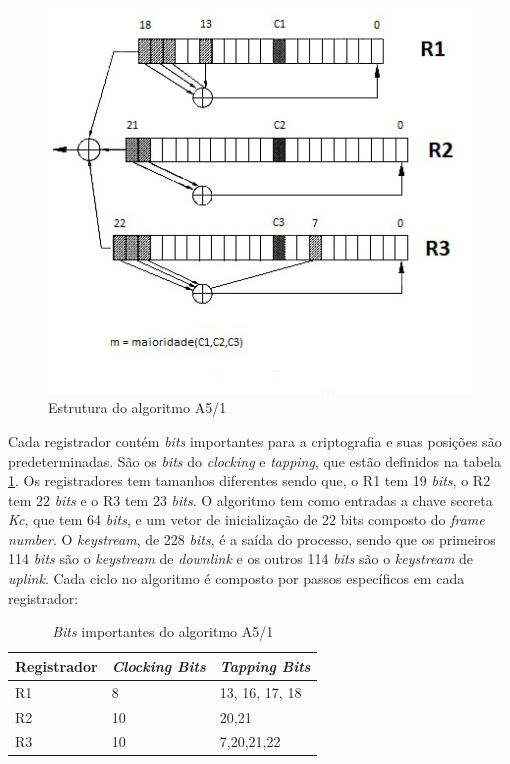 \begin{figure}[h]
\centering
\includegraphics[keepaspectratio=true,scale=0.9]
    {figuras/a5_1.eps}
    \caption[Estrutura do algoritmo A5/1]{Estrutura do algoritmo A5/1\protect\footnotemark} 
\end{figure}

Cada registrador contém \textit{bits} importantes para a criptografia e suas posições são predeterminadas. São os \textit{bits} do \textit{clocking} e \textit{tapping}, que estão definidos na tabela \ref{important-bits}. Os registradores tem tamanhos diferentes sendo que, o R1 tem 19 \textit{bits}, o R2 tem 22 \textit{bits} e o R3 tem 23 \textit{bits}. O algoritmo tem como entradas a chave secreta \textit{Kc}, que tem 64 \textit{bits}, e um vetor de inicialização de 22 bits composto do \textit{frame number}. O \textit{keystream}, de 228 \textit{bits}, é a saída do processo, sendo que os primeiros 114 \textit{bits} são o \textit{keystream} de \textit{downlink} e os outros 114 \textit{bits} são o \textit{keystream} de \textit{uplink}. Cada ciclo no algoritmo é composto por passos específicos em cada registrador:

\begin{table}[h]
\centering
	\begin{tabular}{|l|l|l|}
		\hline
		Registrador & \textit{Clocking Bits} & \textit{Tapping Bits} \\ \hline
		R1 & 8 & 13, 16, 17, 18 \\ \hline
		R2 & 10 & 20,21 \\ \hline
		R3 & 10 & 7,20,21,22 \\ \hline	
	\end{tabular}
	\caption{\textit{Bits} importantes do algoritmo A5/1}
	\label{important-bits}
\end{table}

